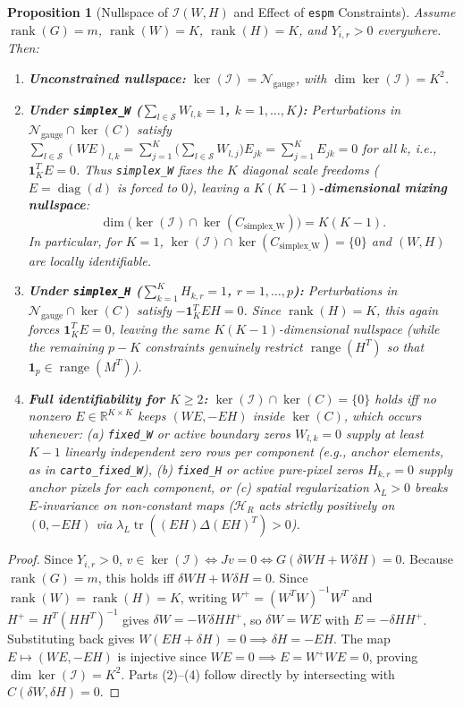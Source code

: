 \documentclass[11pt,a4paper]{article}
\theoremstyle{plain}
\newtheorem{proposition}[theorem]{Proposition}
\theoremstyle{definition}
\theoremstyle{remark}
\newcommand{\R}{\mathbb{R}}
\newcommand{\cS}{\mathcal{S}}
\newcommand{\cN}{\mathcal{N}}
\newcommand{\cI}{\mathcal{I}}
\newcommand{\cH}{\mathcal{H}}
\newcommand{\diag}{\operatorname{diag}}
\newcommand{\tr}{\operatorname{tr}}
\newcommand{\rank}{\operatorname{rank}}
\newcommand{\range}{\operatorname{range}}
\newcommand{\one}{\mathbf{1}}
\begin{document}
\begin{proposition}[Nullspace of $\cI(W,H)$ and Effect of \texttt{espm} Constraints]
\label{prop:nullspace}
Assume $\rank(G) = m$, $\rank(W) = K$, $\rank(H) = K$, and $Y_{i,r} > 0$ everywhere. Then:
\begin{enumerate}[leftmargin=1.5em]
    \item \textbf{Unconstrained nullspace:} $\ker(\cI) = \cN_{\text{gauge}}$, with $\dim \ker(\cI) = K^2$.
    \item \textbf{Under \texttt{simplex\_W} ($\sum_{l\in\cS} W_{l,k} = 1$, $k=1,\dots,K$):} Perturbations in $\cN_{\text{gauge}} \cap \ker(C)$ satisfy $\sum_{l\in\cS} (WE)_{l,k} = \sum_{j=1}^K \big(\sum_{l\in\cS} W_{l,j}\big) E_{jk} = \sum_{j=1}^K E_{jk} = 0$ for all $k$, i.e., $\one_K^T E = 0$. Thus \texttt{simplex\_W} fixes the $K$ diagonal scale freedoms ($E = \diag(d)$ is forced to $0$), leaving a \textbf{$K(K-1)$-dimensional mixing nullspace}:
    \begin{equation}
    \dim\big(\ker(\cI) \cap \ker(C_{\text{simplex\_W}})\big) = K(K-1).
    \end{equation}
    In particular, for $K=1$, $\ker(\cI) \cap \ker(C_{\text{simplex\_W}}) = \{0\}$ and $(W,H)$ are locally identifiable.
    \item \textbf{Under \texttt{simplex\_H} ($\sum_{k=1}^K H_{k,r} = 1$, $r=1,\dots,p$):} Perturbations in $\cN_{\text{gauge}} \cap \ker(C)$ satisfy $-\one_K^T E H = 0$. Since $\rank(H)=K$, this again forces $\one_K^T E = 0$, leaving the same $K(K-1)$-dimensional nullspace (while the remaining $p-K$ constraints genuinely restrict $\range(H^T)$ so that $\one_p \in \range(M^T)$).
    \item \textbf{Full identifiability for $K \ge 2$:} $\ker(\cI) \cap \ker(C) = \{0\}$ holds iff no nonzero $E \in \R^{K \times K}$ keeps $(WE, -EH)$ inside $\ker(C)$, which occurs whenever: (a) \texttt{fixed\_W} or active boundary zeros $W_{l,k}=0$ supply at least $K-1$ linearly independent zero rows per component (e.g., anchor elements, as in \texttt{carto\_fixed\_W}), (b) \texttt{fixed\_H} or active pure-pixel zeros $H_{k,r}=0$ supply anchor pixels for each component, or (c) spatial regularization $\lambda_L > 0$ breaks $E$-invariance on non-constant maps ($\cH_R$ acts strictly positively on $(0, -EH)$ via $\lambda_L \tr((EH)\Delta(EH)^T) > 0$).
\end{enumerate}
\end{proposition}

\begin{proof}
Since $Y_{i,r} > 0$, $v \in \ker(\cI) \iff J v = 0 \iff G(\delta W H + W \delta H) = 0$. Because $\rank(G) = m$, this holds iff $\delta W H + W \delta H = 0$. Since $\rank(W) = \rank(H) = K$, writing $W^+ = (W^T W)^{-1} W^T$ and $H^+ = H^T (H H^T)^{-1}$ gives $\delta W = -W \delta H H^+$, so $\delta W = WE$ with $E = -\delta H H^+$. Substituting back gives $W(EH + \delta H) = 0 \implies \delta H = -EH$. The map $E \mapsto (WE, -EH)$ is injective since $WE = 0 \implies E = W^+ W E = 0$, proving $\dim\ker(\cI) = K^2$. Parts (2)--(4) follow directly by intersecting with $C(\delta W, \delta H) = 0$.
\end{proof}
\end{document}
